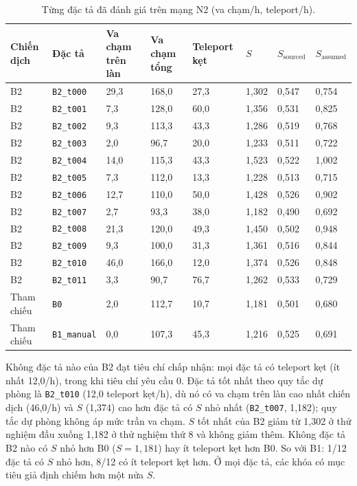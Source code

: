 \documentclass[../main.tex]{subfiles}
\begin{document}
\begin{table}[!htbp]
\centering
\footnotesize\setlength{\tabcolsep}{3pt}
\caption{Từng đặc tả đã đánh giá trên mạng N2 (va chạm/h, teleport/h).}
\label{table:4.interim_specs}
\label{section:appendix_specs}
\begin{tabular}{|p{1.2cm}|p{2.6cm}|p{1.5cm}|p{1.6cm}|p{1.6cm}|p{1.3cm}|p{1.6cm}|p{1.6cm}|}
\hline
\textbf{Chiến dịch} & \textbf{Đặc tả} & \textbf{Va chạm trên làn} & \textbf{Va chạm tổng} & \textbf{Teleport kẹt} & \textbf{$S$} & \textbf{$S_{\text{sourced}}$} & \textbf{$S_{\text{assumed}}$} \\ \hline
B2 & \texttt{B2\_t000} & 29,3 & 168,0 & 27,3 & 1,302 & 0,547 & 0,754 \\ \hline
B2 & \texttt{B2\_t001} & 7,3 & 128,0 & 60,0 & 1,356 & 0,531 & 0,825 \\ \hline
B2 & \texttt{B2\_t002} & 9,3 & 113,3 & 43,3 & 1,286 & 0,519 & 0,768 \\ \hline
B2 & \texttt{B2\_t003} & 2,0 & 96,7 & 20,0 & 1,233 & 0,511 & 0,722 \\ \hline
B2 & \texttt{B2\_t004} & 14,0 & 115,3 & 43,3 & 1,523 & 0,522 & 1,002 \\ \hline
B2 & \texttt{B2\_t005} & 7,3 & 112,0 & 13,3 & 1,228 & 0,513 & 0,715 \\ \hline
B2 & \texttt{B2\_t006} & 12,7 & 110,0 & 50,0 & 1,428 & 0,526 & 0,902 \\ \hline
B2 & \texttt{B2\_t007} & 2,7 & 93,3 & 38,0 & 1,182 & 0,490 & 0,692 \\ \hline
B2 & \texttt{B2\_t008} & 21,3 & 120,0 & 49,3 & 1,450 & 0,502 & 0,948 \\ \hline
B2 & \texttt{B2\_t009} & 9,3 & 100,0 & 31,3 & 1,361 & 0,516 & 0,844 \\ \hline
B2 & \texttt{B2\_t010} & 46,0 & 166,0 & 12,0 & 1,374 & 0,526 & 0,848 \\ \hline
B2 & \texttt{B2\_t011} & 3,3 & 90,7 & 76,7 & 1,262 & 0,533 & 0,729 \\ \hline
Tham chiếu & \texttt{B0} & 2,0 & 112,7 & 10,7 & 1,181 & 0,501 & 0,680 \\ \hline
Tham chiếu & \texttt{B1\_manual} & 0,0 & 107,3 & 45,3 & 1,216 & 0,525 & 0,691 \\ \hline
\end{tabular}
\end{table}

Không đặc tả nào của B2 đạt tiêu chí chấp nhận: mọi đặc tả có teleport kẹt (ít nhất 12,0/h), trong khi tiêu chí yêu cầu 0. Đặc tả tốt nhất theo quy tắc dự phòng là \texttt{B2\_t010} (12,0 teleport kẹt/h), dù nó có va chạm trên làn cao nhất chiến dịch (46,0/h) và $S$ (1,374) cao hơn đặc tả có $S$ nhỏ nhất (\texttt{B2\_t007}, 1,182); quy tắc dự phòng không áp mức trần va chạm. $S$ tốt nhất của B2 giảm từ 1,302 ở thử nghiệm đầu xuống 1,182 ở thử nghiệm thứ 8 và không giảm thêm. Không đặc tả B2 nào có $S$ nhỏ hơn B0 ($S = 1{,}181$) hay ít teleport kẹt hơn B0. So với B1: 1/12 đặc tả có $S$ nhỏ hơn, 8/12 có ít teleport kẹt hơn. Ở mọi đặc tả, các khóa có mục tiêu giả định chiếm hơn một nửa $S$.
\end{document}
